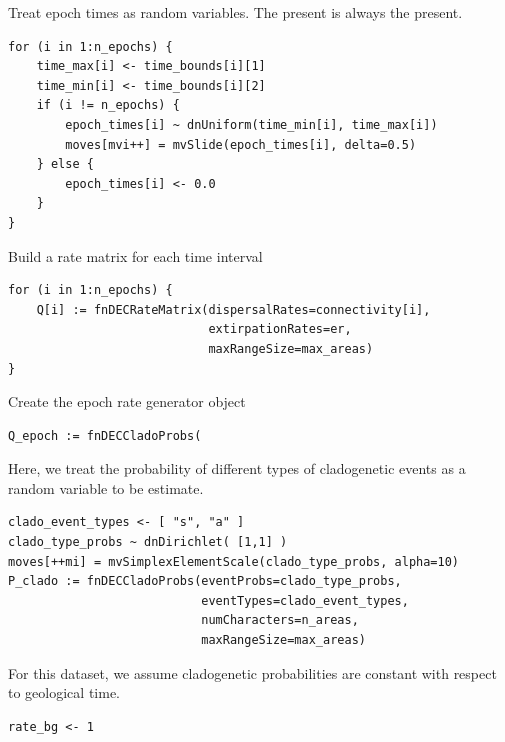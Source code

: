 Treat epoch times as random variables. The present is always the present.
\begin{snugshade}
\begin{lstlisting}
for (i in 1:n_epochs) {
    time_max[i] <- time_bounds[i][1]
    time_min[i] <- time_bounds[i][2]
    if (i != n_epochs) {
        epoch_times[i] ~ dnUniform(time_min[i], time_max[i])
        moves[mvi++] = mvSlide(epoch_times[i], delta=0.5)
    } else {
        epoch_times[i] <- 0.0
    }
}
\end{lstlisting}
\end{snugshade}



Build a rate matrix for each time interval
\begin{snugshade}
\begin{lstlisting}
for (i in 1:n_epochs) {
    Q[i] := fnDECRateMatrix(dispersalRates=connectivity[i],
                            extirpationRates=er,
                            maxRangeSize=max_areas)
}
\end{lstlisting}
\end{snugshade}


Create the epoch rate generator object
\begin{snugshade}
\begin{lstlisting}
Q_epoch := fnDECCladoProbs(
\end{lstlisting}
\end{snugshade}


Here, we treat the probability of different types of cladogenetic events as a random variable to be estimate.

\begin{snugshade}
\begin{lstlisting}
clado_event_types <- [ "s", "a" ]
clado_type_probs ~ dnDirichlet( [1,1] )
moves[++mi] = mvSimplexElementScale(clado_type_probs, alpha=10)
P_clado := fnDECCladoProbs(eventProbs=clado_type_probs,
                           eventTypes=clado_event_types,
                           numCharacters=n_areas,
                           maxRangeSize=max_areas)
\end{lstlisting}
\end{snugshade}

For this dataset, we assume cladogenetic probabilities are constant with respect to geological time.


\begin{snugshade}
\begin{lstlisting}
rate_bg <- 1
\end{lstlisting}
\end{snugshade}


